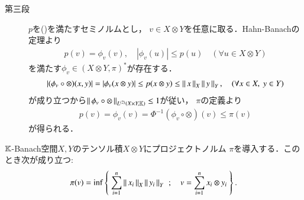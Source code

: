 \begin{prf}
\begin{description}
			\item[第三段]
				$p$を()を満たすセミノルムとし，
				$v \in X \otimes Y$を任意に取る．Hahn-Banachの定理より
				\begin{align}
					p(v) = \phi_v(v),
					\quad |\phi_v(u)| \leq p(u)
					\quad (\forall u \in X \otimes Y)
				\end{align}
				を満たす$\phi_v \in (X \otimes Y,\pi)^*$が存在する．
				\begin{align}
					\left| (\phi_v \circ \otimes)(x,y) \right|
					= \left|\phi_v(x \otimes y)\right| 
					\leq p(x \otimes y)
					\leq \Norm{x}{X} \Norm{y}{Y},
					\quad (\forall x \in X,\ y \in Y)
				\end{align}
				が成り立つから$\Norm{\phi_v \circ \otimes}{\ContLn{X \times Y}{\K}{2}} \leq 1$が従い，
				$\pi$の定義より
				\begin{align}
					p(v) = \phi_v(v) = \Phi^{-1}(\phi_v \circ \otimes)(v)
					\leq \pi(v)
				\end{align}
				が得られる．
				\QED
		\end{description}
	\end{prf}
	
	\begin{screen}
		\begin{thm}[プロジェクティブノルムの表現]
			$\K$-Banach空間$X,Y$のテンソル積$X \otimes Y$にプロジェクトノルム
			$\pi$を導入する．このとき次が成り立つ:
			\begin{align}
				\pi(v) = \inf{}{\Set{\sum_{i=1}^n \Norm{x_i}{X}\Norm{y_i}{Y}}{
					v = \sum_{i=1}^n x_i \otimes y_i}}.
			\end{align}
		\end{thm}
	\end{screen}
	
